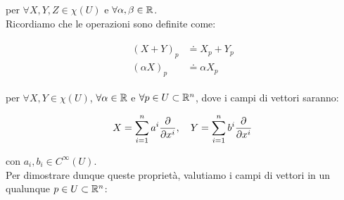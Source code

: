 per $ \forall X, Y, Z \in \chi(U) $ e $ \forall \alpha, \beta \in \mathbb{R} $.\\
Ricordiamo che le operazioni sono definite come:

\begin{align}
	\begin{split}
		(X + Y)_{p} &\doteq X_{p} + Y_{p}\\
		(\alpha X)_{p} &\doteq \alpha X_{p}
	\end{split}
\end{align}

per $ \forall X, Y \in \chi(U) $, $ \forall \alpha \in \mathbb{R} $ e $ \forall p \in U \subset \mathbb{R}^{n} $, dove i campi di vettori saranno:

\begin{equation}
	X = \sum_{i=1}^{n} a^{i} \pdv{x^{i}} \qcomma Y = \sum_{i=1}^{n} b^{i} \pdv{x^{i}}
\end{equation}

con $ a_{i}, b_{i} \in C^{\infty}(U) $.\\
Per dimostrare dunque queste proprietà, valutiamo i campi di vettori in un qualunque $ p \in U \subset \mathbb{R}^{n} $:

